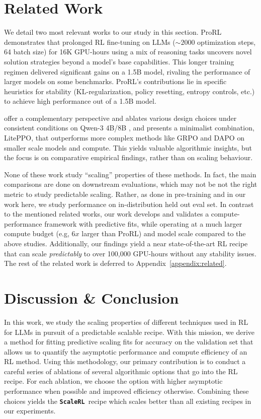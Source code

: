 \documentclass[]{fairmeta} %
\newcommand{\scalerl}{\texttt{\textbf{ScaleRL}}}
\begin{document}
\section{Related Work}
\label{sec:related}

We detail two most relevant works to our study in this section. ProRL \citep{prorl} demonstrates that prolonged RL fine-tuning on LLMs ($\sim2000$ optimization steps, 64 batch size) for 16K GPU-hours using a mix of reasoning tasks uncovers novel solution strategies beyond a model's base capabilities. This longer training regimen delivered significant gains on a 1.5B model, rivaling the performance of larger models on some benchmarks. ProRL's contributions lie in specific heuristics for stability (KL-regularization, policy resetting, entropy controls, etc.) to achieve high performance out of a 1.5B model. 

\citet{tricks_traps} offer a complementary perspective and ablates various design choices under consistent conditions on Qwen-3 4B/8B \citep{qwen3report}, and presents a minimalist combination, LitePPO, that outperforms more complex methods like GRPO \citep{shao2024deepseek} and DAPO \citep{yu2025dapo} on smaller scale models and compute. This yields valuable algorithmic insights, but the focus is on comparative empirical findings, rather than on scaling behaviour. 

None of these work study ``scaling'' properties of these methods. In fact, the main comparisons are done on downstream evaluations, which may not be not the right metric to study predictable scaling. Rather, as done in pre-training and in our work here,  we study performance on in-distribution held out eval set. In contrast to the mentioned related works, our work develops and validates a compute-performance framework with predictive fits, while operating at a much larger compute budget (e.g, $6x$ larger than ProRL) and model scale compared to the above studies. 
Additionally, our findings yield a near state-of-the-art RL recipe that can scale \emph{predictably} to over 100,000 GPU-hours without any stability issues. The rest of the related work is deferred to Appendix~\ref{appendix:related}.


\section{Discussion \& Conclusion}
\label{sec:conclusion}

In this work, we study the scaling properties of different techniques used in RL for LLMs in pursuit of a predictable scalable recipe. With this mission, we derive a method for fitting predictive scaling fits for accuracy on the validation set that allows us to quantify the asymptotic performance and compute efficiency of an RL method. Using this methodology, our primary contribution is to conduct a careful series of ablations of several algorithmic options that go into the RL recipe.
For each ablation, we choose the option with higher asymptotic performance when possible and improved efficiency otherwise. 
Combining these choices yields the \scalerl\ recipe which scales better than all existing recipes in our experiments.
\end{document}
